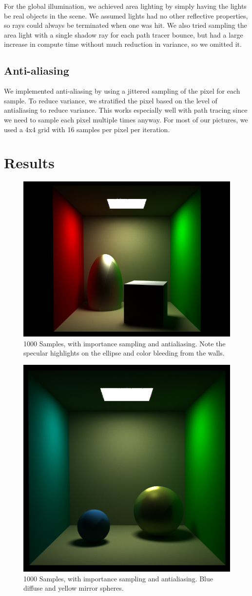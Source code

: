 \documentclass[11pt]{article}
\begin{document}
For the global illumination, we achieved area lighting by simply having the lights be real objects in the scene. We assumed lights had no other reflective properties, so rays could always be terminated when one was hit. We also tried sampling the area light with a single shadow ray for each path tracer bounce, but had a large increase in compute time without much reduction in variance, so we omitted it.

\subsection{Anti-aliasing}

We implemented anti-aliasing by using a jittered sampling of the pixel for each sample. To reduce variance, we stratified the pixel based on the level of antialiasing to reduce variance. This works especially well with path tracing since we need to sample each pixel multiple times anyway. For most of our pictures, we used a 4x4 grid with 16 samples per pixel per iteration. 

\section{Results}

\begin{figure}
	\begin{center}
		\includegraphics[width=.5\linewidth]{figs/specular_ellipse_1000samples}
		\caption{1000 Samples, with importance sampling and antialiasing. Note the specular highlights
		on the ellipse and color bleeding from the walls.}
	\end{center}
\end{figure}
\begin{figure}
	\begin{center}
		\includegraphics[width=.5\linewidth]{figs/2spheres_1000samples}
		\caption{1000 Samples, with importance sampling and antialiasing. Blue diffuse and yellow mirror spheres.}
	\end{center}
\end{figure}
\end{document}
